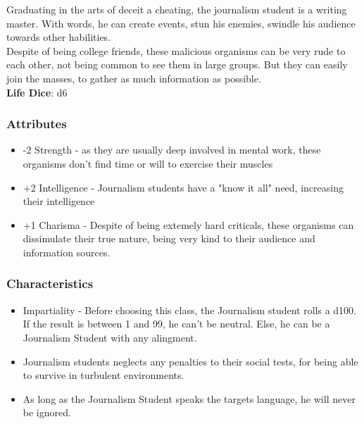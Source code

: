 \documentclass[ letterpaper,12pt]{article}
\begin{document}
Graduating in the arts of deceit a cheating, the journalism student is a writing master. With words, he can create events, stun his enemies, swindle his audience towards other habilities.\\
Despite of being college friends, these malicious organisms can be very rude to each other, not being common to see them in large groups. But they can easily join the masses, to gather as much information as possible.\\

{\bf Life Dice}: d6


\subsubsection{Attributes}
\begin{itemize}
\item{-2 Strength - as they are usually deep involved in mental work, these organisms don't find time or will to exercise their muscles}
\item{+2 Intelligence - Journalism students have a "know it all" need, increasing their intelligence}
\item{+1 Charisma - Despite of being extemely hard criticals, these organisms can dissimulate their true nature, being very kind to their audience and information sources.}
\end{itemize}

\subsubsection{Characteristics}

\begin{itemize}
\item{Impartiality - Before choosing this class, the Journalism student rolls a d100. If the result is between 1 and 99, he can't be neutral. Else, he can be a Journalism Student with any alingment.}
\item{Journalism students neglects any penalties to their social tests, for being able to survive in turbulent environments.}
\item{As long as the Journalism Student speaks the targets language, he will never be ignored.}
\end{itemize}
\end{document}
